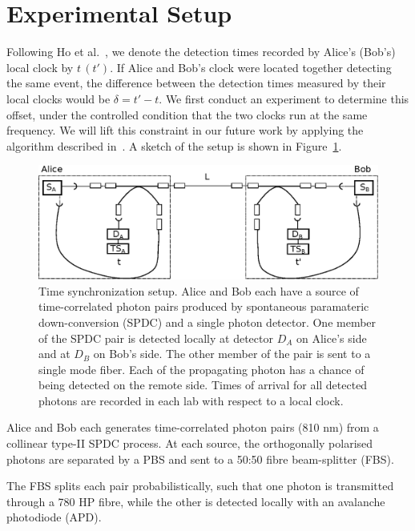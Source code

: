 \documentclass[aps,pra,onecolumn, superscriptaddress]{revtex4}
\begin{document}
\section{Experimental Setup}
      
Following Ho et al.~\cite{Ho2009}, we denote the detection times recorded by Alice's (Bob's) local clock by $t\,(t')$. 
If Alice and Bob's clock were located together detecting the same event, the difference between the detection times measured by their local clocks would be $\delta = t' - t$.
We first conduct an experiment to determine this offset, under the controlled condition that the two clocks run at the same frequency. 
We will lift this constraint in our future work by applying the algorithm described in~\cite{Ho2009}.
A sketch of the setup is shown in Figure~\ref{fig:setup}.

\begin{figure}[htbp]
  \centering
  \includegraphics[width=16cm]{figures/setup_simplified.eps}
  \caption{\label{fig:setup}
  Time synchronization setup. Alice and Bob each have a source of time-correlated photon pairs produced by spontaneous paramateric down-conversion (SPDC) and a single photon detector. One member of the SPDC pair is detected locally at detector $D_A$ on Alice's side and at $D_B$ on Bob's side. The other member of the pair is sent to a single mode fiber. Each of the propagating photon has a chance of being detected on the remote side. Times of arrival for all detected photons are recorded in each lab with respect to a local clock. 
  }
\end{figure}

Alice and Bob each generates time-correlated photon pairs (810 nm) from a collinear type-II SPDC process.
At each source, the orthogonally polarised photons are separated by a PBS and sent to a 50:50 fibre beam-splitter (FBS).

The FBS splits each pair probabilistically, such that one photon is transmitted through a 780 HP fibre, while the other is detected locally with an avalanche photodiode (APD).
\end{document}
